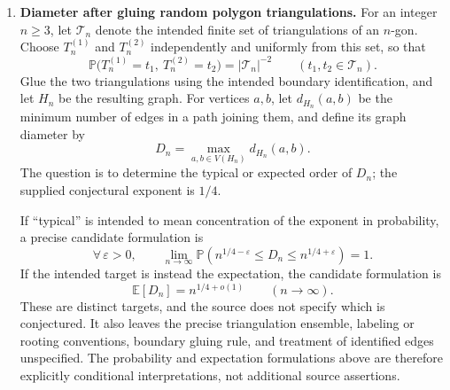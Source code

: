 \documentclass[11pt]{article}
\begin{document}
\begin{enumerate}
The question asks whether every point \(x\in S\) is the initial point of a geodesic ray \(\gamma:[0,\infty)\to S\) that avoids every singularity and escapes to infinity. Escape to infinity means
\[
\forall\, C\subseteq S\text{ compact}\quad
\exists\,T\geq0\quad
\forall\,t\geq T:\ \gamma(t)\notin C.
\]
The avoidance condition requires clarification: if it means
\(\gamma([0,\infty))\cap\Sigma=\varnothing\), then it is incompatible with \(\gamma(0)=x\) for singular initial points. Two possible formulations are to restrict the initial point to \(S\setminus\Sigma\), or to allow any initial point and require only
\(\gamma((0,\infty))\cap\Sigma=\varnothing\). The record does not choose between them.

The meaning of ``geodesic ray'' also needs specification: a globally minimizing unit-speed ray satisfies
\[
d_S(\gamma(s),\gamma(t))=|s-t|\qquad(s,t\geq0),
\]
whereas a unit-speed locally geodesic curve need not satisfy this identity globally. The source does not distinguish these meanings. It also does not say whether all singularities are the finitely many negatively curved ones, or whether additional singularities of other curvature signs are allowed, nor does it specify boundary conventions. These qualifications remain unresolved.

\item \textbf{Diameter after gluing random polygon triangulations.} For an integer \(n\geq3\), let \(\mathcal T_n\) denote the intended finite set of triangulations of an \(n\)-gon. Choose \(T_n^{(1)}\) and \(T_n^{(2)}\) independently and uniformly from this set, so that
\[
\mathbb P\bigl(T_n^{(1)}=t_1,\ T_n^{(2)}=t_2\bigr)
=|\mathcal T_n|^{-2}
\qquad(t_1,t_2\in\mathcal T_n).
\]
Glue the two triangulations using the intended boundary identification, and let \(H_n\) be the resulting graph. For vertices \(a,b\), let \(d_{H_n}(a,b)\) be the minimum number of edges in a path joining them, and define its graph diameter by
\[
D_n=\max_{a,b\in V(H_n)}d_{H_n}(a,b).
\]
The question is to determine the typical or expected order of \(D_n\); the supplied conjectural exponent is \(1/4\).

If ``typical'' is intended to mean concentration of the exponent in probability, a precise candidate formulation is
\[
\forall\,\varepsilon>0,\qquad
\lim_{n\to\infty}
\mathbb P\!\left(n^{1/4-\varepsilon}\leq D_n\leq n^{1/4+\varepsilon}\right)=1.
\]
If the intended target is instead the expectation, the candidate formulation is
\[
\mathbb E[D_n]=n^{1/4+o(1)}\qquad(n\to\infty).
\]
These are distinct targets, and the source does not specify which is conjectured. It also leaves the precise triangulation ensemble, labeling or rooting conventions, boundary gluing rule, and treatment of identified edges unspecified. The probability and expectation formulations above are therefore explicitly conditional interpretations, not additional source assertions.
\end{enumerate}
\end{document}
